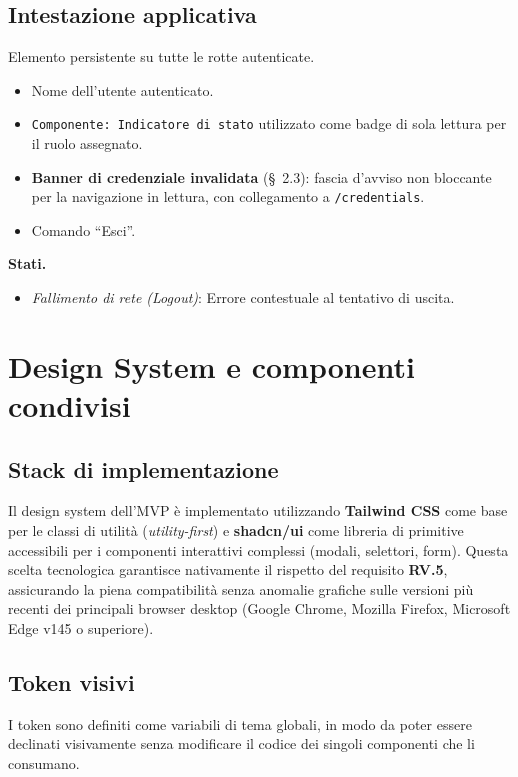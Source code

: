 \documentclass[11pt,a4paper]{article}
\begin{document}
\subsection{Intestazione applicativa}

Elemento persistente su tutte le rotte autenticate.
\begin{itemize}
    \item Nome dell'utente autenticato.
    \item \texttt{Componente: Indicatore di stato} utilizzato come badge di sola lettura per il ruolo assegnato.
    \item \textbf{Banner di credenziale invalidata} (\S~2.3): fascia d'avviso non bloccante per la navigazione in lettura, con collegamento a \texttt{/credentials}.
    \item Comando ``Esci''.
\end{itemize}

\textbf{Stati.}
\begin{itemize}
    \item \emph{Fallimento di rete (Logout)}: Errore contestuale al tentativo di uscita.
\end{itemize}

\section{Design System e componenti condivisi}

\subsection{Stack di implementazione}

Il design system dell'MVP è implementato utilizzando \textbf{Tailwind CSS} come base per le classi di utilità (\emph{utility-first}) e \textbf{shadcn/ui} come libreria di primitive accessibili per i componenti interattivi complessi (modali, selettori, form). Questa scelta tecnologica garantisce nativamente il rispetto del requisito \textbf{RV.5}, assicurando la piena compatibilità senza anomalie grafiche sulle versioni più recenti dei principali browser desktop (Google Chrome, Mozilla Firefox, Microsoft Edge v145 o superiore).

\subsection{Token visivi}

I token sono definiti come variabili di tema globali, in modo da poter essere declinati visivamente senza modificare il codice dei singoli componenti che li consumano.
\end{document}
